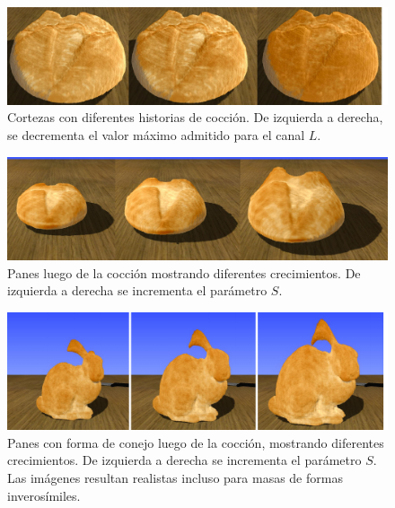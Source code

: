 \begin{figure}[!ht]
\begin{center}
\includegraphics[width=13cm]{figures/Fig13}
\caption[Corteza con diferentes historias de cocción]{Cortezas con diferentes historias de cocción. De izquierda a derecha, se decrementa el valor máximo admitido para el canal $L$.}
\label{fg:bakingcolors}
\end{center}
\end{figure}


\begin{figure}[!ht]
\begin{center}
\includegraphics[width=13cm]{figures/Fig14}
\caption[Panes luego de la cocción mostrando diferentes crecimientos]{Panes luego de la cocción mostrando diferentes crecimientos. De izquierda a derecha se incrementa el parámetro $S$.}
\label{fg:bakingdeform}
\end{center}
\end{figure}

\begin{figure}[!ht]
\begin{center}
\includegraphics[width=13cm]{figures/Fig15}
\caption[Panes con forma de conejo luego de la cocción, mostrando diferentes crecimientos]{Panes con forma de conejo luego de la cocción, mostrando diferentes crecimientos. De izquierda a derecha se incrementa el parámetro $S$. Las imágenes resultan realistas incluso para masas de formas inverosímiles.}
\label{fg:bakingdeform2}
\end{center}
\end{figure}


